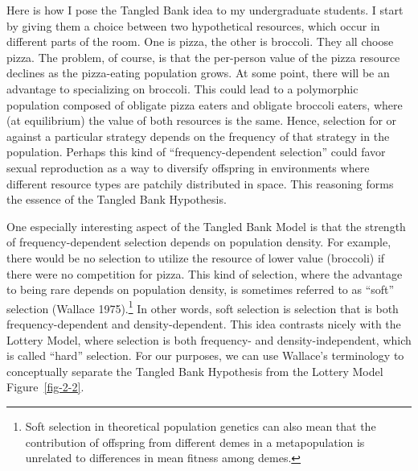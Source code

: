 \documentclass[
  letterpaper,
]{book}
\begin{document}
Here is how I pose the Tangled Bank idea to my undergraduate students. I
start by giving them a choice between two hypothetical resources, which
occur in different parts of the room. One is pizza, the other is
broccoli. They all choose pizza. The problem, of course, is that the
per-person value of the pizza resource declines as the pizza-eating
population grows. At some point, there will be an advantage to
specializing on broccoli. This could lead to a polymorphic population
composed of obligate pizza eaters and obligate broccoli eaters, where
(at equilibrium) the value of both resources is the same. Hence,
selection for or against a particular strategy depends on the frequency
of that strategy in the population. Perhaps this kind of
``frequency-dependent selection'' could favor sexual reproduction as a
way to diversify offspring in environments where different resource
types are patchily distributed in space. This reasoning forms the
essence of the Tangled Bank Hypothesis.

One especially interesting aspect of the Tangled Bank Model is that the
strength of frequency-dependent selection depends on population density.
For example, there would be no selection to utilize the resource of
lower value (broccoli) if there were no competition for pizza. This kind
of selection, where the advantage to being rare depends on population
density, is sometimes referred to as ``soft'' selection (Wallace
1975).\footnote{Soft selection in theoretical population genetics can
  also mean that the contribution of offspring from different demes in a
  metapopulation is unrelated to differences in mean fitness among
  demes.} In other words, soft selection is selection that is both
frequency-dependent and density-dependent. This idea contrasts nicely
with the Lottery Model, where selection is both frequency- and
density-independent, which is called ``hard'' selection. For our
purposes, we can use Wallace's terminology to conceptually separate the
Tangled Bank Hypothesis from the Lottery Model Figure~\ref{fig-2-2}.
\end{document}
